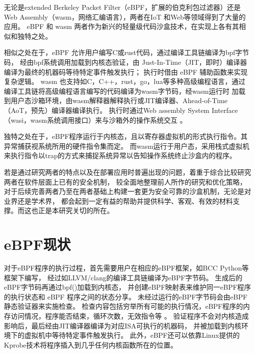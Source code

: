 \documentclass[12pt,a4paper]{article}
\begin{document}
	\begin{sloppypar} %
	\begin{CJK*}{UTF8}{song}
	无论是extended Berkeley Packet Filter（eBPF，扩展的伯克利包过滤器）还是Web Assembly（wasm，网络汇编语言），两者在IoT
	\cite{zhangResearchWebAssemblyRuntimes2024}和Web\cite{9110434, TCPdump, 10.1145/3371038}等领域得到了大量的应用。
	eBPF 和 wasm 两者作为新兴的轻量级代码沙盒技术，在实现上各有其相似和独特之处。

	相似之处在于，eBPF 允许用户编写C或rust代码，通过编译工具链编译为bpf字节码，
	经由bpf系统调用加载到内核态验证，由 Just-In-Time（JIT，即时）编译器编译为最终的机器码等待特定事件触发执行\cite{FuzzOnEBPF}；
	执行时借由 eBPF 辅助函数来实现复杂逻辑\cite{riceLearningEBPFProgramming2023}。
	wasm 也支持如C，C++，rust，go，lua等多种高级编程语言，通过编译工具链将高级编程语言编写的代码编译为wasm字节码，经wasm运行时
	加载到用户态沙箱环境，由wasm解释器解释执行或JIT编译器、Ahead-of-Time（AoT，预先）编译器编译执行\cite[6]{zhangResearchWebAssemblyRuntimes2024}。
	执行时通过Web assembly System Interface（wasi，wasm系统调用接口）来与沙箱外的操作系统交互
	\cite{zhangResearchWebAssemblyRuntimes2024, zhangCharacterizingDetectingWebAssembly2024}。

	独特之处在于，eBPF程序运行于内核态，且以寄存器虚拟机的形式执行指令。其异常捕获视系统所用的硬件指令集而定。
	而wasm运行于用户态，采用栈式虚拟机来执行指令以trap的方式来捕捉系统异常以告知操作系统终止沙盒内的程序\cite{groupWebAssemblySpecification2024}。

	若是通过研究两者的特点以及在部署应用时普遍出现的问题，着重于综合比较研究两者在软件层面上已有的安全机制，
	较全面地整理前人所作的研究和优化策略，对于后续完善两者乃至在两者基础上构建一套更为安全可靠的沙盒机制，无论是对业界还是学术界，
	都会起到一定有益的帮助并提供科学、客观、有效的材料支撑。而这也正是本研究关切的所在。

	\section{eBPF现状}
	对于eBPF程序的执行过程，首先需要用户在相应的eBPF框架，如BCC Python等框架下编写，
	经过如LLVM/clang的编译工具链编译为eBPF字节码\cite{riceLearningEBPFProgramming2023}。
	生成后的eBPF字节码再通过bpf()加载到内核态\cite{riceLearningEBPFProgramming2023}，
	并创建eBPF映射表来维护同一eBPF程序的执行状态和 eBPF 程序之间的状态分享\cite[2]{bensonNetEditOrchestrationPlatform2024}。
	未经过运行的eBPF字节码会由eBPF静态验证器来实施检查\cite{zhengBpftimeUserspaceEBPF2023, HaoValidating}。
	检查内容包括穷举所有可能的执行情况，eBPF程序的内存访问情况，程序能否结束，循环次数，无效指令等
	\cite{286467, riceLearningEBPFProgramming2023}。
	验证程序不会对内核造成影响后，最后经由JIT编译器编译为对应ISA可执行的机器码\cite{FuzzOnEBPF}，
	并被加载到内核环境下的虚拟机中等待特定事件触发执行\cite{maoMerlinMultitierOptimization2024}。
	此外，eBPF还可以依靠Linux提供的Kprobe技术将程序插入到几乎任何内核函数所在的位置\cite{riceLearningEBPFProgramming2023}。


\end{CJK*}
\end{sloppypar}
\end{document}
